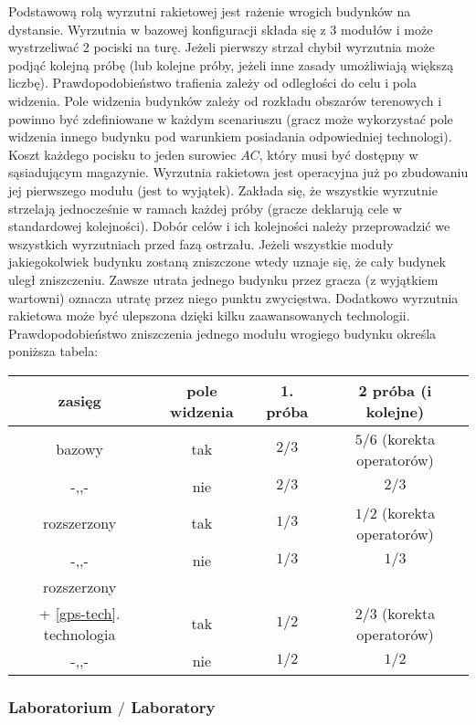 \documentclass[11pt,a4paper]{article}
\begin{document}
Podstawową rolą wyrzutni rakietowej jest rażenie wrogich budynków na dystansie. Wyrzutnia w bazowej konfiguracji składa się z 3 modułów i może wystrzeliwać 2 pociski na turę. Jeżeli pierwszy strzał chybił wyrzutnia może podjąć kolejną próbę (lub kolejne próby, jeżeli inne zasady umożliwiają większą liczbę). Prawdopodobieństwo trafienia zależy od odległości do celu i pola widzenia. Pole widzenia budynków zależy od rozkładu obszarów terenowych i powinno być zdefiniowane w każdym scenariuszu (gracz może wykorzystać pole widzenia innego budynku pod warunkiem posiadania odpowiedniej technologi). Koszt każdego pocisku to jeden surowiec $AC$, który musi być dostępny w sąsiadującym magazynie. Wyrzutnia rakietowa jest operacyjna już po zbudowaniu jej pierwszego modułu (jest to wyjątek). Zakłada się, że wszystkie wyrzutnie strzelają jednocześnie w ramach każdej próby (gracze deklarują cele w standardowej kolejności). Dobór celów i ich kolejności należy przeprowadzić we wszystkich wyrzutniach przed fazą ostrzału. Jeżeli wszystkie moduły jakiegokolwiek budynku zostaną zniszczone wtedy uznaje się, że cały budynek uległ zniszczeniu. Zawsze utrata jednego budynku przez gracza  (z wyjątkiem wartowni) oznacza utratę przez niego punktu zwycięstwa. Dodatkowo wyrzutnia rakietowa może być ulepszona dzięki kilku zaawansowanych technologii. Prawdopodobieństwo zniszczenia jednego modułu wrogiego budynku określa poniższa tabela:
\begin{center}
\begin{tabular}{| c | c | c | c |}
  \hline
   \textbf{zasięg} & \textbf{pole widzenia} & \textbf{1. próba} & \textbf{2 próba} (i kolejne) \\
  \hline
  bazowy & tak   & $2/3$ & $5/6$ (korekta operatorów) \\  
  \hline
  -,,- & nie   & $2/3$ & $2/3$ \\  
  \hline
  rozszerzony & tak & $1/3$ & $1/2$ (korekta operatorów) \\  
  \hline
  -,,- & nie  & $1/3$ & $1/3$ \\  
  \hline
  rozszerzony  &  &  &  \\  
  + \ref{gps-tech}. technologia & tak  & $1/2$ & $2/3$ (korekta operatorów) \\  
  \hline
  -,,- & nie   & $1/2$ & $1/2$ \\  
  \hline
\end{tabular}
\end{center}

\subsubsection{Laboratorium $/$ Laboratory}
\end{document}
